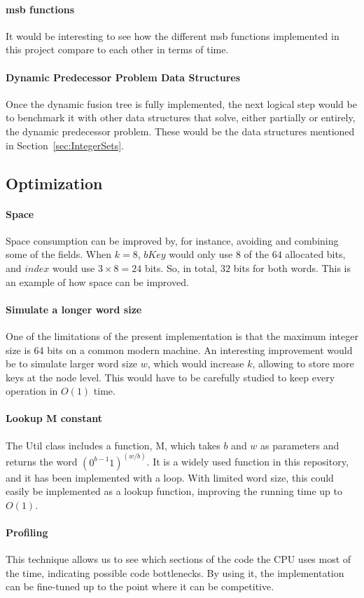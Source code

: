 \paragraph*{msb functions}
It would be interesting to see how the different msb functions implemented in this project compare to each other in terms of time.

\paragraph*{Dynamic Predecessor Problem Data Structures}
Once the dynamic fusion tree is fully implemented, the next logical step would be to benchmark it with other data structures that solve, either partially or entirely, the dynamic predecessor problem. These would be the data structures mentioned in Section~\ref{sec:IntegerSets}.

\subsection{Optimization}

\paragraph*{Space}
Space consumption can be improved by, for instance, avoiding and combining some of the fields. When $k = 8$, $bKey$ would only use $8$ of the $64$ allocated bits, and $index$ would use $3 \times 8 = 24$ bits. So, in total, $32$ bits for both words. This is an example of how space can be improved.

\paragraph*{Simulate a longer word size}
One of the limitations of the present implementation is that the maximum integer size is 64 bits on a common modern machine. An interesting improvement would be to simulate larger word size $w$, which would increase $k$, allowing to store more keys at the node level. This would have to be carefully studied to keep every operation in $O(1)$ time.


\paragraph*{Lookup {\ttfamily M} constant}
The {\ttfamily Util} class includes a function, {\ttfamily M}, which takes $b$ and $w$ as parameters and returns the word $(0^{b-1}1)^{(w/b)}$. It is a widely used function in this repository, and it has been implemented with a loop. With limited word size, this could easily be implemented as a lookup function, improving the running time up to $O(1)$.

\paragraph*{Profiling}
This technique allows us to see which sections of the code the CPU uses most of the time, indicating possible code bottlenecks. By using it, the implementation can be fine-tuned up to the point where it can be competitive.
